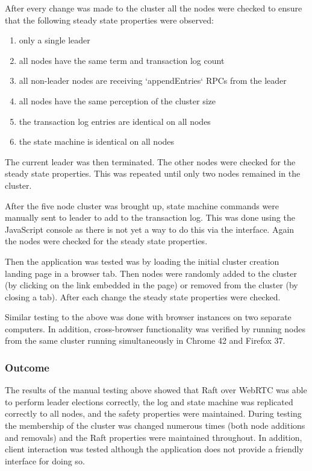 \documentclass[9pt]{extarticle}
\begin{document}
\begin{multicols}{2}
After every change was made to the cluster all the nodes were checked
to ensure that the following steady state properties were observed:
\begin{enumerate}
\item only a single leader
\item all nodes have the same term and transaction log count
\item all non-leader nodes are receiving `appendEntries` RPCs from the leader
\item all nodes have the same perception of the cluster size
\item the transaction log entries are identical on all nodes
\item the state machine is identical on all nodes
\end{enumerate}

The current leader was then terminated. The other nodes were checked
for the steady state properties. This was repeated until only two
nodes remained in the cluster.

After the five node cluster was brought up, state machine commands
were manually sent to leader to add to the transaction log. This was
done using the JavaScript console as there is not yet a way to do this
via the interface. Again the nodes were checked for the steady state
properties.

Then the application was tested was by loading the initial cluster
creation landing page in a browser tab. Then nodes were randomly added
to the cluster (by clicking on the link embedded in the page) or
removed from the cluster (by closing a tab). After each change the
steady state properties were checked.

Similar testing to the above was done with browser instances on two
separate computers. In addition, cross-browser functionality was
verified by running nodes from the same cluster running simultaneously
in Chrome 42 and Firefox 37.


\subsubsection{Outcome}

The results of the manual testing above showed that Raft over WebRTC
was able to perform leader elections correctly, the log and state
machine was replicated correctly to all nodes, and the safety
properties were maintained. During testing the membership of the
cluster was changed numerous times (both node additions and removals)
and the Raft properties were maintained throughout. In addition,
client interaction was tested although the application does not
provide a friendly interface for doing so.


\end{multicols}
\end{document}
